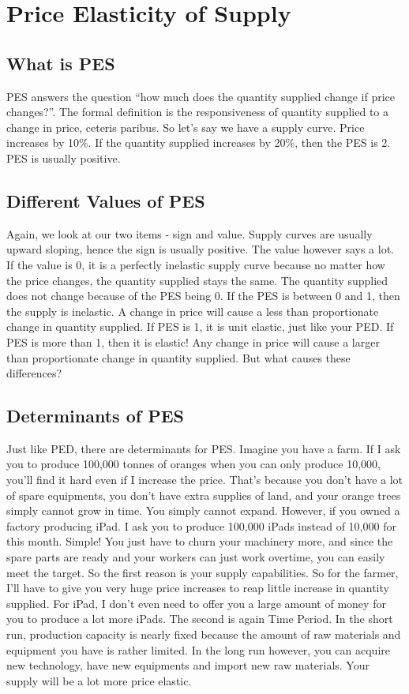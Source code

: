 \documentclass[DIV=calc,11pt,parskip,numbers=noenddot]{scrartcl} %
\begin{document}
\section{Price Elasticity of Supply}
\subsection{What is PES}
PES answers the question “how much does the quantity supplied change if price changes?”. The formal definition is the responsiveness of quantity supplied to a change in price, ceteris paribus. So let’s say we have a supply curve. Price increases by 10\%. If the quantity supplied increases by 20\%, then the PES is 2. PES is usually positive.
\subsection{Different Values of PES}
Again, we look at our two items - sign and value. Supply curves are usually upward sloping, hence the sign is usually positive. The value however says a lot. If the value is 0, it is a perfectly inelastic supply curve because no matter how the price changes, the quantity supplied stays the same. The quantity supplied does not change because of the PES being 0. If the PES is between 0 and 1, then the supply is inelastic. A change in price will cause a less than proportionate change in quantity supplied. If PES is 1, it is unit elastic, just like your PED. If PES is more than 1, then it is elastic! Any change in price will cause a larger than proportionate change in quantity supplied. But what causes these differences?
\subsection{Determinants of PES}
Just like PED, there are determinants for PES. Imagine you have a farm. If I ask you to produce 100,000 tonnes of oranges when you can only produce 10,000, you’ll find it hard even if I increase the price. That’s because you don’t have a lot of spare equipments, you don’t have extra supplies of land, and your orange trees simply cannot grow in time. You simply cannot expand. However, if you owned a factory producing iPad. I ask you to produce 100,000 iPads instead of 10,000 for this month. Simple! You just have to churn your machinery more, and since the spare parts are ready and your workers can just work overtime, you can easily meet the target. So the first reason is your supply capabilities. So for the farmer, I’ll have to give you very huge price increases to reap little increase in quantity supplied. For iPad, I don’t even need to offer you a large amount of money for you to produce a lot more iPads. The second is again Time Period. In the short run, production capacity is nearly fixed because the amount of raw materials and equipment you have is rather limited. In the long run however, you can acquire new technology, have new equipments and import new raw materials. Your supply will be a lot more price elastic.
\end{document}
